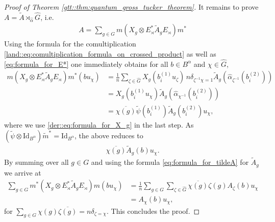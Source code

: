 \documentclass{amsart}
\theoremstyle{definition}
\theoremstyle{definition}
\begin{document}
\begin{proof}[Proof of Theorem \ref{gtt::thm:quantum_gross_tucker_theorem}]
    It remains to prove $A = \tilde{A} \rtimes_{\hat{\alpha}} \hat{G}$, i.e.
    \begin{align*}
        A = \sum_{g \in G} m(X_{g} \otimes E_\rtimes^\ast \tilde{A}_g E_\rtimes) m^\ast
    \end{align*}
    Using the formula for the comultiplication \eqref{land::eq:comultiplication_formula_on_crossed_product} as well as \eqref{eq:formula_for_E*} one immediately obtains for all $b \in B^\alpha$ and $\chi \in \hat{G}$,
    \begin{align*}
        m(X_{g} \otimes E_\rtimes^\ast \tilde{A}_g E_\rtimes) m^\ast(b u_\chi)
            &= \frac{1}{n} \sum_{\zeta \in \hat{G}} X_g\left(b_i^{(1)} u_\zeta\right) \, n \delta_{\zeta^{-1}\chi = 1} \tilde{A}_g\left(\hat{\alpha}_{\zeta^{-1}}(b_i^{(2)})\right) \\
            &= X_g\left(b_i^{(1)} u_\chi\right) \tilde{A}_g\left(\hat{\alpha}_{\chi^{-1}}(b_i^{(2)})\right) \\
            &= \overline{\chi({g})} \tilde{\psi}\left(b_i^{(1)}\right) \tilde{A}_g\left(b_i^{(2)}\right) u_\chi,
    \end{align*}
    where we use \eqref{der::eq:formula_for_X_g} in the last step. As $\left(\tilde{\psi} \otimes \mathrm{Id}_{B^\alpha}\right) \tilde{m}^\ast = \mathrm{Id}_{B^\alpha}$, the above reduces to
    \begin{align*}
        \overline{\chi(g)} \tilde{A}_g(b) u_\chi.
    \end{align*}
    By summing over all $g \in G$ and using the formula \eqref{eq:formula_for_tildeA} for $\tilde{A}_g$ we arrive at
    \begin{align*}
        \sum_{g \in G} m^\ast(X_g \otimes E_\rtimes^\ast \tilde{A}_g E_\rtimes) m(b u_\chi)
            &= \frac{1}{n} \sum_{g \in G} \sum_{\zeta \in \hat{G}} \overline{\chi(g)} \zeta(g) A_\zeta(b) u_\chi \\
            &= A_\chi(b) u_\chi,
    \end{align*}
    for $\sum_{g \in G} \chi(g) \overline{\zeta(g)} = n \delta_{\zeta = \chi}$.
    This concludes the proof.
\end{proof}
\end{document}
